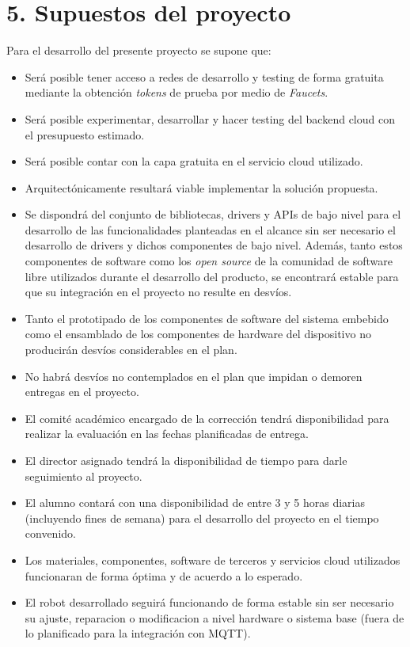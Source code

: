\documentclass[
11pt, %
]{charter}
\begin{document}
\section{5. Supuestos del proyecto}
\label{sec:supuestos}

Para el desarrollo del presente proyecto se supone que:

\begin{itemize}
	\item Será posible tener acceso a redes de desarrollo y testing de forma gratuita mediante la obtención \textit{tokens} de prueba por medio de \textit{Faucets}.
	\item Será posible experimentar, desarrollar y hacer testing del backend cloud con el presupuesto estimado.
	\item Será posible contar con la capa gratuita en el servicio cloud utilizado.
	\item Arquitectónicamente resultará viable implementar la solución propuesta.
	\item Se dispondrá del conjunto de bibliotecas, drivers y APIs de bajo nivel para el desarrollo de las funcionalidades planteadas en el alcance sin ser necesario el desarrollo de drivers y dichos componentes de bajo nivel. Además, tanto estos componentes de software como los  \textit{open source} de la comunidad de software libre utilizados durante el desarrollo del producto, se encontrará estable para que su integración en el proyecto no resulte en desvíos.	
	\item Tanto el prototipado de los componentes de software del sistema embebido como el ensamblado de los componentes de hardware del dispositivo no producirán desvíos considerables en el plan.
	\item No habrá desvíos no contemplados en el plan que impidan o demoren entregas en el proyecto.
	\item El comité académico encargado de la corrección tendrá disponibilidad para realizar la evaluación en las fechas planificadas de entrega.
	\item El director asignado tendrá la disponibilidad de tiempo para darle seguimiento al proyecto.
	\item El alumno contará con una disponibilidad de entre 3 y 5 horas diarias (incluyendo fines de semana) para el desarrollo del proyecto en el tiempo convenido.
	\item Los materiales, componentes, software de terceros y servicios cloud utilizados funcionaran de forma óptima y de acuerdo a lo esperado.
	\item El robot desarrollado seguirá funcionando de forma estable sin ser necesario su ajuste, reparacion o modificacion a nivel hardware o sistema base (fuera de lo planificado para la integración con MQTT).

\end{itemize}
\end{document}
